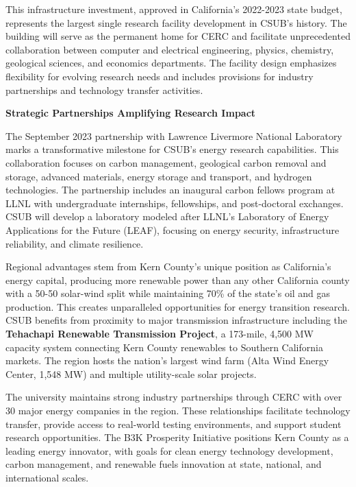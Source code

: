 \documentclass[11pt]{article}
\begin{document}
This infrastructure investment, approved in California's 2022-2023 state budget, represents the largest single research facility development in CSUB's history. The building will serve as the permanent home for CERC and facilitate unprecedented collaboration between computer and electrical engineering, physics, chemistry, geological sciences, and economics departments. The facility design emphasizes flexibility for evolving research needs and includes provisions for industry partnerships and technology transfer activities.

\textbf{Strategic Partnerships Amplifying Research Impact}

The September 2023 partnership with Lawrence Livermore National Laboratory marks a transformative milestone for CSUB's energy research capabilities. This collaboration focuses on carbon management, geological carbon removal and storage, advanced materials, energy storage and transport, and hydrogen technologies. The partnership includes an inaugural carbon fellows program at LLNL with undergraduate internships, fellowships, and post-doctoral exchanges. CSUB will develop a laboratory modeled after LLNL's Laboratory of Energy Applications for the Future (LEAF), focusing on energy security, infrastructure reliability, and climate resilience.

Regional advantages stem from Kern County's unique position as California's energy capital, producing more renewable power than any other California county with a 50-50 solar-wind split while maintaining 70\% of the state's oil and gas production. This creates unparalleled opportunities for energy transition research. CSUB benefits from proximity to major transmission infrastructure including the \textbf{Tehachapi Renewable Transmission Project}, a 173-mile, 4,500 MW capacity system connecting Kern County renewables to Southern California markets. The region hosts the nation's largest wind farm (Alta Wind Energy Center, 1,548 MW) and multiple utility-scale solar projects.

The university maintains strong industry partnerships through CERC with over 30 major energy companies in the region. These relationships facilitate technology transfer, provide access to real-world testing environments, and support student research opportunities. The B3K Prosperity Initiative positions Kern County as a leading energy innovator, with goals for clean energy technology development, carbon management, and renewable fuels innovation at state, national, and international scales.
\end{document}

